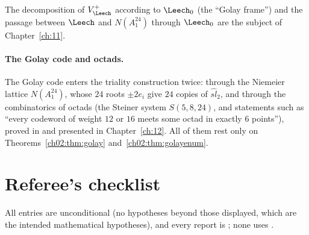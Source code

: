 The decomposition of $V_\Leech^+$ according to $\Leech_0$ (the ``Golay frame'') and the passage
between $\Leech$ and $N(A_1^{24})$ through $\Leech_0$ are the subject of Chapter~\ref{ch:11}.

\paragraph{The Golay code and octads.}  The Golay code enters the triality construction twice:
through the Niemeier lattice $N(A_1^{24})$, whose $24$ roots $\pm2e_i$ give $24$ copies of
$\widehat{sl}_2$, and through the combinatorics of octads (the Steiner system $S(5,8,24)$, and
statements such as ``every codeword of weight $12$ or $16$ meets some octad in exactly $6$
points''), proved in  and presented in
Chapter~\ref{ch:12}.  All of them rest only on Theorems~\ref{ch02:thm:golay}
and~\ref{ch02:thm:golayenum}.

\section{Referee's checklist}\label{ch02:sec:checklist}

All entries are unconditional (no hypotheses beyond those displayed, which are the intended
mathematical hypotheses), and every  report is ; none uses .

